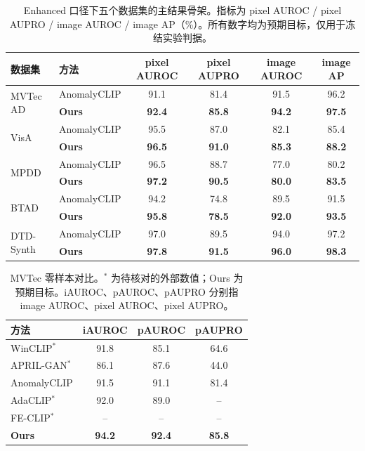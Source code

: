 \begin{table}[t]
\centering
\caption{Enhanced 口径下五个数据集的主结果骨架。指标为 pixel AUROC / pixel AUPRO / image AUROC / image AP（\%）。所有数字均为预期目标，仅用于冻结实验判据。}
\label{tab:main}
\small
\begin{tabular}{llcccc}
\toprule
数据集 & 方法 & pixel AUROC & pixel AUPRO & image AUROC & image AP \\
\midrule
\multirow{2}{*}{MVTec AD} & AnomalyCLIP & 91.1 & 81.4 & 91.5 & 96.2 \\
 & \textbf{Ours} & \textbf{92.4} & \textbf{85.8} & \textbf{94.2} & \textbf{97.5} \\
\midrule
\multirow{2}{*}{VisA} & AnomalyCLIP & 95.5 & 87.0 & 82.1 & 85.4 \\
 & \textbf{Ours} & \textbf{96.5} & \textbf{91.0} & \textbf{85.3} & \textbf{88.2} \\
\midrule
\multirow{2}{*}{MPDD} & AnomalyCLIP & 96.5 & 88.7 & 77.0 & 80.2 \\
 & \textbf{Ours} & \textbf{97.2} & \textbf{90.5} & \textbf{80.0} & \textbf{83.5} \\
\midrule
\multirow{2}{*}{BTAD} & AnomalyCLIP & 94.2 & 74.8 & 89.5 & 91.5 \\
 & \textbf{Ours} & \textbf{95.8} & \textbf{78.5} & \textbf{92.0} & \textbf{93.5} \\
\midrule
\multirow{2}{*}{DTD-Synth} & AnomalyCLIP & 97.0 & 89.5 & 94.0 & 97.2 \\
 & \textbf{Ours} & \textbf{97.8} & \textbf{91.5} & \textbf{96.0} & \textbf{98.3} \\
\bottomrule
\end{tabular}
\end{table}

\begin{table}[t]
\centering
\caption{MVTec 零样本对比。$^{*}$ 为待核对的外部数值；Ours 为预期目标。iAUROC、pAUROC、pAUPRO 分别指 image AUROC、pixel AUROC、pixel AUPRO。}
\label{tab:sota}
\small
\setlength{\tabcolsep}{4.5pt}
\begin{tabular}{lccc}
\toprule
方法 & iAUROC & pAUROC & pAUPRO \\
\midrule
WinCLIP$^{*}$    & 91.8 & 85.1 & 64.6 \\
APRIL-GAN$^{*}$  & 86.1 & 87.6 & 44.0 \\
AnomalyCLIP      & 91.5 & 91.1 & 81.4 \\
AdaCLIP$^{*}$    & 92.0 & 89.0 & --   \\
FE-CLIP$^{*}$    & --   & --   & --   \\
\midrule
\textbf{Ours}    & \textbf{94.2} & \textbf{92.4} & \textbf{85.8} \\
\bottomrule
\end{tabular}
\end{table}

